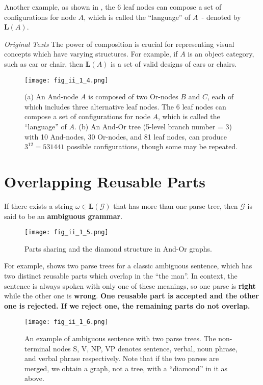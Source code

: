 \documentclass[../Notes_of_CaRiVaC.tex]{subfiles}
\begin{document}
Another example, as shown in , the 6 leaf nodes can compose a set
of configurations for node $A$, which is called the ``language'' of $A$~-
denoted by $\mathbf{L}(A)$.

\begin{textbox}{\textit{Original Texts}}
The power of composition is crucial for representing visual concepts which have
varying structures. For example, if $A$ is an object category, such as car or
chair, then $\mathbf{L}(A)$ is a set of valid designs of cars or chairs.
\end{textbox}
%
\begin{figure}[!htpb]
  \centering
  \texttt{[image: fig\_ii\_1\_4.png]}
  \caption{(a) An And-node $A$ is composed of two Or-nodes $B$ and $C$, each of
    which includes three alternative leaf nodes. The 6 leaf nodes can compose a
    set of configurations for node $A$, which is called the ``language'' of
    $A$. (b) An And-Or tree (5-level branch number = 3) with 10 And-nodes, 30
    Or-nodes, and 81 leaf nodes, can produce $3^{12} = 531441$ possible
    configurations, though some may be repeated.}%
  \label{fig:ii.1.4}
\end{figure}
%

\section{Overlapping Reusable Parts}%
\label{sec:ii.1.3}
If there exists a string $\omega \in \mathbf{L}(\mathcal{G})$ that has more
than one parse tree, then $\mathcal{G}$ is said to be an \textbf{ambiguous
grammar}.
%
\begin{figure}[!htpb]
  \centering
  \texttt{[image: fig\_ii\_1\_5.png]}
  \caption{Parts sharing and the diamond structure in And-Or graphs.}%
  \label{fig:ii.1.5}
\end{figure}
%

For example,  shows two parse trees for a classic ambiguous
sentence, which has two distinct reusable parts which overlap in the
``the man''. In context, the sentence is always spoken with only one of these
meanings, so one parse is \textbf{right} while the other one is \textbf{wrong}.
\textbf{One reusable part is accepted and the other one is rejected. If we
reject one, the remaining parts do not overlap.}
%
\begin{figure}[!htpb]
  \centering
  \texttt{[image: fig\_ii\_1\_6.png]}
  \caption{An example of ambiguous sentence with two parse trees. The
    non-terminal nodes S, V, NP, VP denotes sentence, verbal, noun phrase, and
    verbal phrase respectively. Note that if the two parses are merged, we
    obtain a graph, not a tree, with a ``diamond'' in it as above.}%
  \label{fig:ii.1.6}
\end{figure}
%
\end{document}
